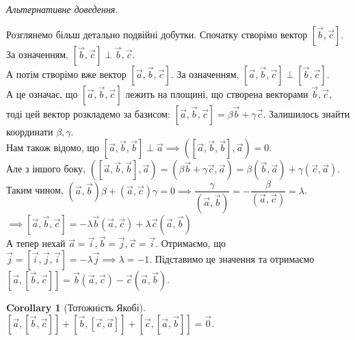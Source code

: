 \documentclass[a4paper, 10pt]{extarticle}
\theoremstyle{theoremdd}
\theoremstyle{theoremdd}
\theoremstyle{theoremdd}
\theoremstyle{theoremdd}
\theoremstyle{theoremdd}
\theoremstyle{theoremdd}
\theoremstyle{theoremdd}
\theoremstyle{theoremdd}
\newtheorem{corollary}[theorem]{Corollary}
\begin{document}
\textit{Альтернативне доведення.}
\begin{figure}[H]
\centering
{}
\end{figure}
Розглянемо більш детально подвійні добутки. Спочатку створімо вектор $[\vec{b}, \vec{c}]$. За означенням, $[\vec{b}, \vec{c}] \perp \vec{b},\vec{c}$.\\
А потім створімо вже вектор $[\vec{a},\vec{b},\vec{c}]$. За означенням, $[\vec{a},\vec{b},\vec{c}] \perp [\vec{b}, \vec{c}]$.\\
А це означає, що $[\vec{a},\vec{b},\vec{c}]$ лежить на площині, що створена векторами $\vec{b},\vec{c}$, тоді цей вектор розкладемо за базисом: $[\vec{a}, \vec{b}, \vec{c}] = \beta \vec{b} + \gamma \vec{c}$. Залишилось знайти координати $\beta, \gamma$.\\
Нам також відомо, що $[\vec{a},\vec{b},\vec{b}] \perp \vec{a} \implies ([\vec{a}, \vec{b}, \vec{b}], \vec{a}) = 0$.\\
Але з іншого боку, $([\vec{a}, \vec{b}, \vec{b}], \vec{a}) = (\beta \vec{b} + \gamma \vec{c}, \vec{a}) = \beta (\vec{b}, \vec{a}) + \gamma (\vec{c}, \vec{a})$.\\
Таким чином, $(\vec{a}, \vec{b}) \beta + (\vec{a}, \vec{c}) \gamma = 0 \implies \dfrac{\gamma}{(\vec{a}, \vec{b})} = - \dfrac{\beta}{(\vec{a}, \vec{c})} = \lambda$.\\
$\implies [\vec{a}, \vec{b}, \vec{c}] = -\lambda \vec{b} (\vec{a}, \vec{c}) + \lambda \vec{c} (\vec{a}, \vec{b})$\\
А тепер нехай $\vec{a} = \vec{i}, \vec{b} = \vec{j}, \vec{c} = \vec{i}$. Отримаємо, що $\vec{j} = [\vec{i}, \vec{j}, \vec{i}] = -\lambda \vec{j} \implies \lambda = -1$. Підставимо це значення та отримаємо $[\vec{a},[\vec{b},\vec{c}]] = \vec{b} (\vec{a}, \vec{c}) - \vec{c} (\vec{a}, \vec{b})$.

\begin{corollary}[Тотожність Якобі]
$[\vec{a}, [\vec{b}, \vec{c}]] + [\vec{b}, [\vec{c}, \vec{a}]] + [\vec{c}, [\vec{a}, \vec{b}]] = \vec{0}$.
\end{corollary}

\iffalse
\end{document}

